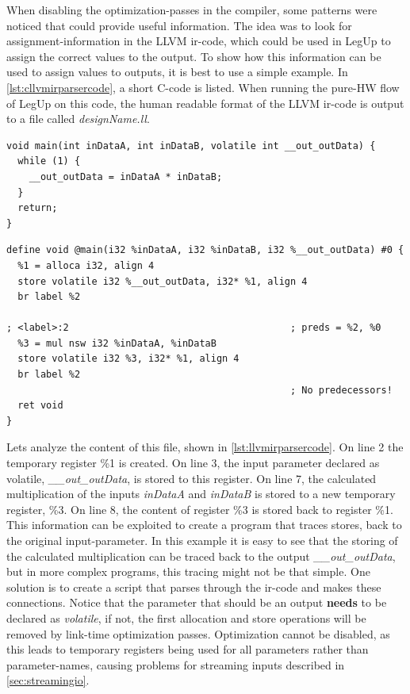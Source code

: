 When disabling the optimization-passes in the compiler, some patterns were noticed that could provide useful information. The idea was to look for assignment-information in the LLVM \gls{ir}-code, which could be used in LegUp to assign the correct values to the output. To show how this information can be used to assign values to outputs, it is best to use a simple example. In \cref{lst:cllvmirparsercode}, a short C-code is listed. When running the pure-HW flow of LegUp on this code, the human readable format of the LLVM \gls{ir}-code is output to a file called \textit{designName.ll}.
\clearpage
\lstset{language=C,style=Cstyle}
\begin{lstlisting}[caption={Simple C-code example for LLVM IR parsing},label=lst:cllvmirparsercode]
void main(int inDataA, int inDataB, volatile int __out_outData) {
  while (1) {
    __out_outData = inDataA * inDataB;
  }
  return;
}
\end{lstlisting}
\lstset{language=LLVM,style=LLVMStyle}
\begin{lstlisting}[caption={LLVM IR code for simple parsing example},label=lst:llvmirparsercode]
define void @main(i32 %inDataA, i32 %inDataB, i32 %__out_outData) #0 {
  %1 = alloca i32, align 4
  store volatile i32 %__out_outData, i32* %1, align 4
  br label %2

; <label>:2                                       ; preds = %2, %0
  %3 = mul nsw i32 %inDataA, %inDataB
  store volatile i32 %3, i32* %1, align 4
  br label %2
                                                  ; No predecessors!
  ret void
}
\end{lstlisting}
Lets analyze the content of this file, shown in \cref{lst:llvmirparsercode}. On line 2 the temporary register \%1 is created. On line 3, the input parameter declared as volatile, \textit{\_\_out\_outData}, is stored to this register. On line 7, the calculated multiplication of the inputs \textit{inDataA} and \textit{inDataB} is stored to a new temporary register, \%3. On line 8, the content of register \%3 is stored back to register \%1. This information can be exploited to create a program that traces stores, back to the original input-parameter. In this example it is easy to see that the storing of the calculated multiplication can be traced back to the output \textit{\_\_out\_outData}, but in more complex programs, this tracing might not be that simple. One solution is to create a script that parses through the \gls{ir}-code and makes these connections. Notice that the parameter that should be an output \textbf{needs} to be declared as \textit{volatile}, if not, the first allocation and store operations will be removed by link-time optimization passes. Optimization cannot be disabled, as this leads to temporary registers being used for all parameters rather than parameter-names, causing problems for streaming inputs described in \cref{sec:streamingio}.


